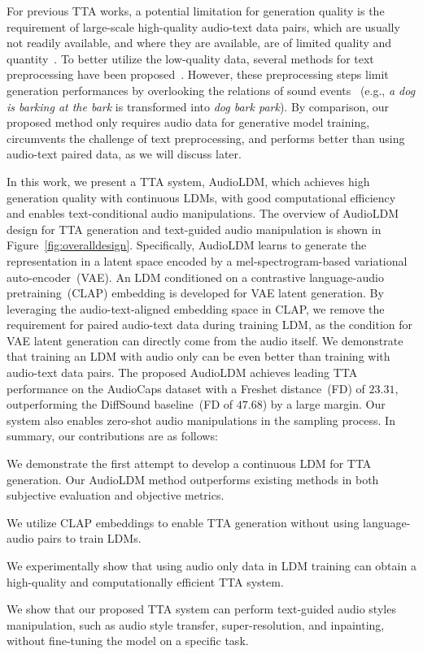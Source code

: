 For previous TTA works, a potential limitation for generation quality is the requirement of large-scale high-quality audio-text data pairs, which are usually not readily available, and where they are available, are  
of limited quality and quantity~\cite{liu2022separate}. To better utilize the low-quality data, several methods for text preprocessing have been proposed~\cite{kreuk2022audiogen, yang2022diffsound}. However, these preprocessing steps limit generation performances by overlooking the relations of sound events~
(e.g., \textit{a dog is barking at the bark} is transformed into \textit{dog bark park}).
By comparison, our proposed method only requires audio data for generative model training, circumvents the challenge of text preprocessing, and performs better than using audio-text paired data, as we will discuss later.  

In this work, we present a TTA system, AudioLDM, which achieves high generation quality with continuous LDMs, with good computational efficiency and enables text-conditional audio manipulations.
The overview of AudioLDM design for TTA generation and text-guided audio manipulation is shown in Figure~\ref{fig:overalldesign}. 
Specifically, AudioLDM learns to generate the representation in a latent space encoded by a mel-spectrogram-based variational auto-encoder~(VAE). An LDM conditioned on a contrastive language-audio pretraining~(CLAP) embedding is developed for VAE latent generation. By leveraging the audio-text-aligned embedding space in CLAP, we remove the requirement for paired audio-text data during training LDM, as the condition for VAE latent generation can directly come from the audio itself. We demonstrate that training an LDM with audio only can be even better than training with audio-text data pairs. The proposed AudioLDM achieves leading TTA performance on the AudioCaps dataset with a Freshet distance~(FD) of $23.31$, outperforming the DiffSound baseline~(FD of $47.68$) by a large margin. Our system also enables zero-shot audio manipulations in the sampling process. In summary, our contributions are as follows:
\begin{list}{}{\leftmargin=1em}
    \setlength{\itemsep}{1pt}
    \setlength{\parskip}{0pt}
    \item We demonstrate the first attempt to develop a continuous LDM for TTA generation. Our AudioLDM method outperforms existing methods in both subjective evaluation and objective metrics.
    \item We utilize CLAP embeddings to enable TTA generation without using language-audio pairs to train LDMs. 
    \item We experimentally show that using audio only data in LDM training can obtain a high-quality and computationally efficient TTA system. 
    \item We show that our proposed TTA system can perform text-guided audio styles manipulation, such as audio style transfer, super-resolution, and inpainting, without fine-tuning the model on a specific task.
\end{list}

